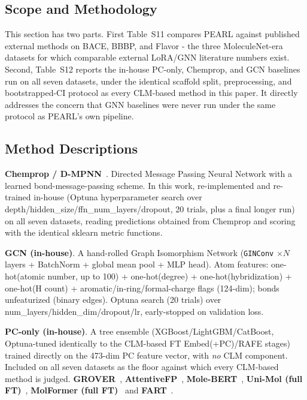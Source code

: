 \documentclass[9pt,a4paper]{article}
\begin{document}
\subsection*{Scope and Methodology}

This section has two parts. First Table~S11
compares PEARL against published external methods on BACE, BBBP, and Flavor - the
three MoleculeNet-era datasets for which comparable external LoRA/GNN literature
numbers exist. Second, Table~S12 reports the
in-house PC-only, Chemprop, and GCN baselines run on all seven datasets, under
the identical scaffold split, preprocessing, and bootstrapped-CI protocol as every
CLM-based method in this paper. It directly addresses the concern that GNN baselines were never run
under the same protocol as PEARL's own pipeline.

\subsection*{Method Descriptions}

\noindent\textbf{Chemprop / D-MPNN}~\cite{yang2019chemprop}.
Directed Message Passing Neural Network with a learned bond-message-passing scheme.
In this work, re-implemented and re-trained in-house (Optuna hyperparameter
search over depth/hidden\_size/ffn\_num\_layers/dropout, 20 trials, plus a final
longer run) on all seven datasets, reading predictions obtained from Chemprop and scoring with the identical sklearn metric functions.

\noindent\textbf{GCN (in-house)}.
A hand-rolled Graph Isomorphism Network (\texttt{GINConv} $\times N$ layers +
BatchNorm + global mean pool + MLP head). Atom features: one-hot(atomic number,
up to 100) + one-hot(degree) + one-hot(hybridization) + one-hot(H count) +
aromatic/in-ring/formal-charge flags (124-dim); bonds unfeaturized (binary edges).
Optuna search (20 trials) over num\_layers/hidden\_dim/dropout/lr, early-stopped
on validation loss.

\noindent\textbf{PC-only (in-house)}.
A tree ensemble (XGBoost/LightGBM/CatBoost, Optuna-tuned identically to the
CLM-based FT Embed(+PC)/RAFE stages) trained directly on the 473-dim PC feature
vector, with \emph{no} CLM component. Included on all seven datasets as the floor
against which every CLM-based method is judged. \textbf{GROVER}~\cite{rong2020grover}, \textbf{AttentiveFP}~\cite{xiong2020attentivefp},
\textbf{Mole-BERT}~\cite{xia2023molecbert}, \textbf{Uni-Mol (full FT)}~\cite{zhou2023unimol},
\textbf{MolFormer (full FT)}~\cite{ross2022molformer} and \textbf{FART}~\cite{zimmermann2024fart}.
\end{document}
